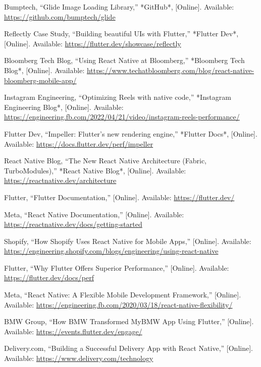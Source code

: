 \documentclass[12pt]{report}
\begin{document}
\begin{thebibliography}{1}
Bumptech, “Glide Image Loading Library,” *GitHub*, [Online]. Available: \url{https://github.com/bumptech/glide}

Reflectly Case Study, “Building beautiful UIs with Flutter,” *Flutter Dev*, [Online]. Available: \url{https://flutter.dev/showcase/reflectly}

Bloomberg Tech Blog, “Using React Native at Bloomberg,” *Bloomberg Tech Blog*, [Online]. Available: \url{https://www.techatbloomberg.com/blog/react-native-bloomberg-mobile-app/}

Instagram Engineering, “Optimizing Reels with native code,” *Instagram Engineering Blog*, [Online]. Available: \url{https://engineering.fb.com/2022/04/21/video/instagram-reels-performance/}

Flutter Dev, “Impeller: Flutter’s new rendering engine,” *Flutter Docs*, [Online]. Available: \url{https://docs.flutter.dev/perf/impeller}

React Native Blog, “The New React Native Architecture (Fabric, TurboModules),” *React Native Blog*, [Online]. Available: \url{https://reactnative.dev/architecture}

  Flutter, “Flutter Documentation,” [Online]. Available: \url{https://flutter.dev/}

  Meta, “React Native Documentation,” [Online]. Available: \url{https://reactnative.dev/docs/getting-started}

  Shopify, “How Shopify Uses React Native for Mobile Apps,” [Online]. Available: \url{https://engineering.shopify.com/blogs/engineering/using-react-native}

  Flutter, “Why Flutter Offers Superior Performance,” [Online]. Available: \url{https://flutter.dev/docs/perf}

  Meta, “React Native: A Flexible Mobile Development Framework,” [Online]. Available: \url{https://engineering.fb.com/2020/03/18/react-native-flexibility/}

  BMW Group, “How BMW Transformed MyBMW App Using Flutter,” [Online]. Available: \url{https://events.flutter.dev/engage/}

  Delivery.com, “Building a Successful Delivery App with React Native,” [Online]. Available: \url{https://www.delivery.com/technology}


\end{thebibliography}
\end{document}
